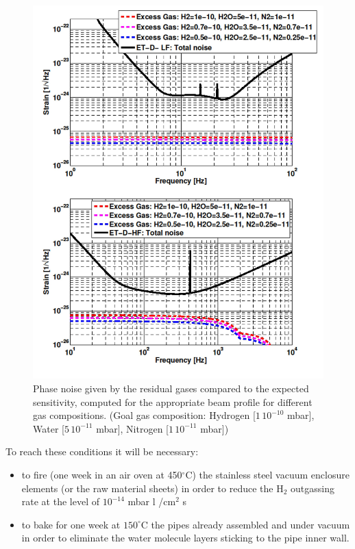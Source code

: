 \begin{figure}
\begin{center}
\includegraphics{Sec_SiteInfra/Figures/VAC3.jpg}
\caption{Phase noise given by the residual gases compared to the expected sensitivity, computed for the appropriate beam profile for different gas compositions. (Goal gas composition: Hydrogen [$1\,10^{-10}$ mbar], Water [$5\,10^{-11}$ mbar], Nitrogen [$1\,10^{-11}$ mbar])}
\label{fig:vac3}
\end{center}
\end{figure}


To reach these conditions it will be necessary:

\begin{itemize}
\item to fire (one week in an air oven at 450$^\circ$C) the stainless steel vacuum enclosure elements (or the raw material sheets) in order to reduce the H$_2$ outgassing rate at the level of $10^{-14}$ mbar l /cm$^{2}$ s
\item to bake for one week at $150^\circ$C the pipes already assembled and under vacuum in order to eliminate the water molecule layers sticking to the pipe inner wall.
\end{itemize}


